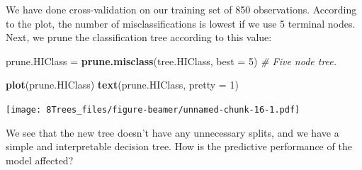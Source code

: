 \documentclass[10pt,ignorenonframetext,]{beamer}
\newenvironment{Shaded}{\begin{snugshade}}{\end{snugshade}}
\newcommand{\KeywordTok}[1]{\textcolor[rgb]{0.13,0.29,0.53}{\textbf{#1}}}
\newcommand{\DataTypeTok}[1]{\textcolor[rgb]{0.13,0.29,0.53}{#1}}
\newcommand{\DecValTok}[1]{\textcolor[rgb]{0.00,0.00,0.81}{#1}}
\newcommand{\StringTok}[1]{\textcolor[rgb]{0.31,0.60,0.02}{#1}}
\newcommand{\CommentTok}[1]{\textcolor[rgb]{0.56,0.35,0.01}{\textit{#1}}}
\newcommand{\NormalTok}[1]{#1}
\begin{document}
\begin{frame}[fragile]

We have done cross-validation on our training set of 850 observations.
According to the plot, the number of misclassifications is lowest if we
use 5 terminal nodes. Next, we prune the classification tree according
to this value:

\begin{Shaded}
\begin{Highlighting}[]
\NormalTok{prune.HIClass =}\StringTok{ }\KeywordTok{prune.misclass}\NormalTok{(tree.HIClass, }\DataTypeTok{best =} \DecValTok{5}\NormalTok{)}
\CommentTok{# Five node tree.}
\end{Highlighting}
\end{Shaded}

\end{frame}

\begin{frame}[fragile]

\begin{Shaded}
\begin{Highlighting}[]
\KeywordTok{plot}\NormalTok{(prune.HIClass)}
\KeywordTok{text}\NormalTok{(prune.HIClass, }\DataTypeTok{pretty =} \DecValTok{1}\NormalTok{)}
\end{Highlighting}
\end{Shaded}

\texttt{[image: 8Trees\_files/figure-beamer/unnamed-chunk-16-1.pdf]}

We see that the new tree doesn't have any unnecessary splits, and we
have a simple and interpretable decision tree. How is the predictive
performance of the model affected?

\end{frame}
\end{document}
